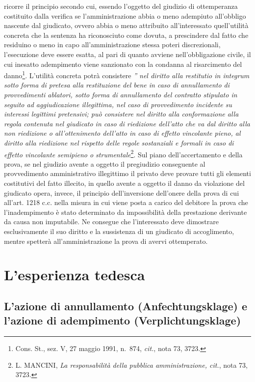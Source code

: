 \documentclass[12pt,it,a4paper,]{report}
\begin{document}
ricorre il principio secondo cui, essendo l'oggetto del giudizio di
ottemperanza costituito dalla verifica se l'amministrazione abbia o meno
adempiuto all'obbligo nascente dal giudicato, ovvero abbia o meno
attribuito all'interessato quell'utilità concreta che la sentenza ha
riconosciuto come dovuta, a prescindere dal fatto che residuino o meno
in capo all'amministrazione stessa poteri discrezionali, l'esecuzione
deve essere esatta, al pari di quanto avviene nell'obbligazione civile,
il cui inesatto adempimento viene sanzionato con la condanna al
risarcimento del danno\footnote{Cons. St., sez. V, 27 maggio 1991,
  n.~874, \emph{cit.}, nota 73, 3723.}. L'utilità concreta potrà
consistere \emph{'' nel diritto alla restitutio in integrum sotto forma
di pretesa alla restituzione del bene in caso di annullamento di
provvedimenti ablatori, sotto forma di annullamento del contratto
stipulato in seguito ad aggiudicazione illegittima, nel caso di
provvedimento incidente su interessi legittimi pretensivi; può
consistere nel diritto alla conformazione alla regola contenuta nel
giudicato in caso di riedizione dell'atto che va dal diritto alla non
riedizione o all'ottenimento dell'atto in caso di effetto vincolante
pieno, al diritto alla riedizione nel rispetto delle regole sostanziali
e formali in caso di effetto vincolante semipieno o
strumentale}\footnote{L. MANCINI, \emph{La responsabilità della pubblica
  amministrazione, cit.}, nota 73, 3723.}. Sul piano dell'accertamento e
della prova, se nel giudizio avente a oggetto il pregiudizio conseguente
al provvedimento amministrativo illegittimo il privato deve provare
tutti gli elementi costitutivi del fatto illecito, in quello avente a
oggetto il danno da violazione del giudicato opera, invece, il principio
dell'inversione dell'onere della prova di cui all'art. 1218 c.c. nella
misura in cui viene posta a carico del debitore la prova che
l'inadempimento è stato determinato da impossibilità della prestazione
derivante da causa non imputabile. Ne consegue che l'interessato deve
dimostrare esclusivamente il suo diritto e la sussistenza di un
giudicato di accoglimento, mentre spetterà all'amministrazione la prova
di avervi ottemperato.

\hypertarget{lesperienza-tedesca}{%
\chapter{L'esperienza tedesca}\label{lesperienza-tedesca}}

\hypertarget{lazione-di-annullamento-anfechtungsklage-e-lazione-di-adempimento-verplichtungsklage}{%
\section{L'azione di annullamento (Anfechtungsklage) e l'azione di
adempimento
(Verplichtungsklage)}\label{lazione-di-annullamento-anfechtungsklage-e-lazione-di-adempimento-verplichtungsklage}}
\end{document}
